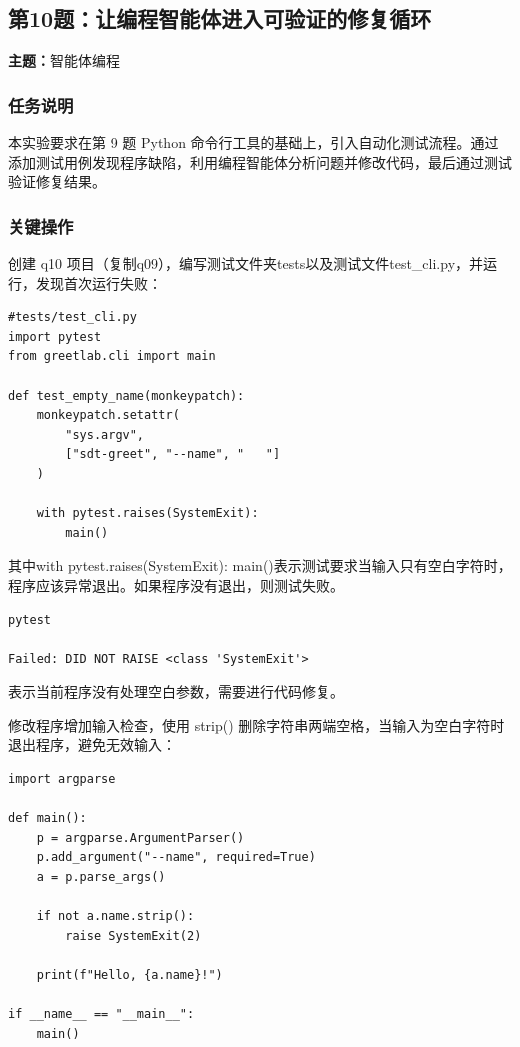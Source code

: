 \documentclass[UTF8,a4paper,11pt]{ctexart}
\newcommand{\taskmeta}[1]{%
  \noindent\textcolor{TextGray}{\textbf{主题：}#1}\par\vspace{0.55em}
}
\begin{document}
\subsection{第10题：让编程智能体进入可验证的修复循环}

\taskmeta{智能体编程}

\subsubsection{任务说明}

本实验要求在第 9 题 Python 命令行工具的基础上，引入自动化测试流程。通过添加测试用例发现程序缺陷，利用编程智能体分析问题并修改代码，最后通过测试验证修复结果。

\subsubsection{关键操作}

创建 q10 项目（复制q09），编写测试文件夹tests以及测试文件test\_cli.py，并运行，发现首次运行失败：

\begin{lstlisting}[style=source]
#tests/test_cli.py
import pytest
from greetlab.cli import main

def test_empty_name(monkeypatch):
    monkeypatch.setattr(
        "sys.argv",
        ["sdt-greet", "--name", "   "]
    )

    with pytest.raises(SystemExit):
        main()
\end{lstlisting}

其中with pytest.raises(SystemExit):  main()表示测试要求当输入只有空白字符时，程序应该异常退出。如果程序没有退出，则测试失败。


\begin{lstlisting}[style=terminal]
pytest

Failed: DID NOT RAISE <class 'SystemExit'>
\end{lstlisting}

表示当前程序没有处理空白参数，需要进行代码修复。

修改程序增加输入检查，使用 strip() 删除字符串两端空格，当输入为空白字符时退出程序，避免无效输入：

\begin{lstlisting}[style=source]
import argparse

def main():
    p = argparse.ArgumentParser()
    p.add_argument("--name", required=True)
    a = p.parse_args()

    if not a.name.strip():
        raise SystemExit(2)

    print(f"Hello, {a.name}!")

if __name__ == "__main__":
    main()
\end{lstlisting}
\end{document}
